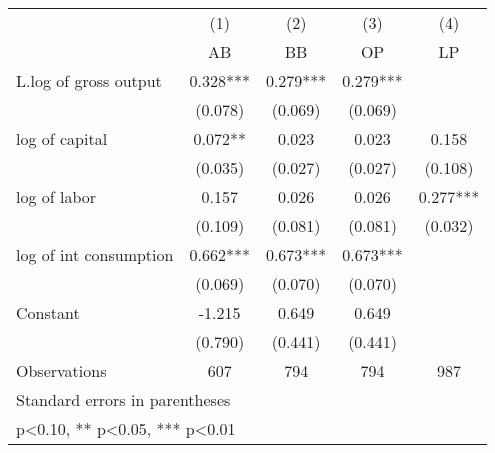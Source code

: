 {
\def\sym#1{\ifmmode^{#1}\else\(^{#1}\)\fi}
\begin{tabular}{l*{4}{c}}
\hline\hline
                    &\multicolumn{1}{c}{(1)}&\multicolumn{1}{c}{(2)}&\multicolumn{1}{c}{(3)}&\multicolumn{1}{c}{(4)}\\
                    &\multicolumn{1}{c}{AB}&\multicolumn{1}{c}{BB}&\multicolumn{1}{c}{OP}&\multicolumn{1}{c}{LP}\\
\hline
L.log of gross output&       0.328***&       0.279***&       0.279***&               \\
                    &     (0.078)   &     (0.069)   &     (0.069)   &               \\
[1em]
log of capital      &       0.072** &       0.023   &       0.023   &       0.158   \\
                    &     (0.035)   &     (0.027)   &     (0.027)   &     (0.108)   \\
[1em]
log of labor        &       0.157   &       0.026   &       0.026   &       0.277***\\
                    &     (0.109)   &     (0.081)   &     (0.081)   &     (0.032)   \\
[1em]
log of int consumption&       0.662***&       0.673***&       0.673***&               \\
                    &     (0.069)   &     (0.070)   &     (0.070)   &               \\
[1em]
Constant            &      -1.215   &       0.649   &       0.649   &               \\
                    &     (0.790)   &     (0.441)   &     (0.441)   &               \\
\hline
Observations        &         607   &         794   &         794   &         987   \\
\hline\hline
\multicolumn{5}{l}{\footnotesize Standard errors in parentheses}\\
\multicolumn{5}{l}{\footnotesize * p<0.10, ** p<0.05, *** p<0.01}\\
\end{tabular}
}
